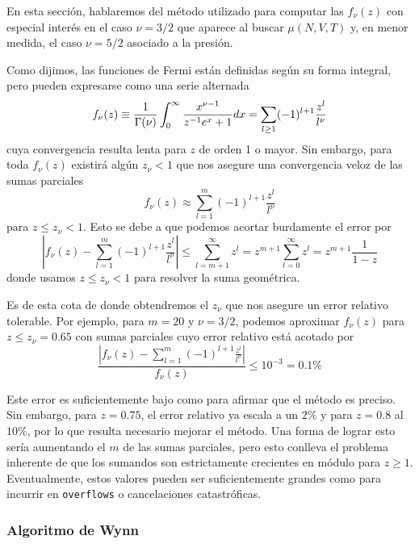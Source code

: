 En esta sección, hablaremos del método utilizado para computar las $f_\nu(z)$ con especial interés en el caso $\nu=3/2$ que aparece al buscar $\mu(N,V,T)$
y, en menor medida, el caso $\nu=5/2$ asociado a la presión.

Como dijimos, las funciones de Fermi están definidas según su forma integral, pero pueden expresarse como una serie alternada
\begin{equation}{\label{eq:fermi_func_serie}}
 f_\nu(z) \equiv \frac{1}{\Gamma(\nu)}\int_0^\infty \frac{x^{\nu-1}}{z^{-1}e^x+1} dx = \sum_{l\geq 1} (-1)^{l+1}\frac{z^l}{l^\nu}
\end{equation}
cuya convergencia resulta lenta para $z$ de orden 1 o mayor.
Sin embargo, para toda $f_\nu(z)$ existirá algún $z_\nu < 1$ que nos asegure una convergencia veloz de las sumas parciales
\[ f_\nu(z) \approx \sum_{l=1}^{m} (-1)^{l+1}\frac{z^l}{l^\nu}\]
para $z\leq z_\nu < 1$.
Esto se debe a que podemos acortar burdamente el error por
\[ \left|f_\nu(z) - \sum_{l=1}^{m}(-1)^{l+1}\frac{z^l}{l^\nu}\right| \leq \sum_{l=m+1}^\infty z^l = z^{m+1}\sum_{l=0}^\infty z^l = z^{m+1} \frac{1}{1-z} \]
donde usamos $z\leq z_\nu < 1$ para resolver la suma geométrica.

Es de esta cota de donde obtendremos el $z_\nu$ que nos asegure un error relativo tolerable.
Por ejemplo, para $m=20$ y $\nu = 3/2$, podemos aproximar $f_\nu(z)$ para $z\leq z_\nu = 0.65$ con sumas parciales cuyo error relativo está acotado por
\[\frac{|f_\nu(z) - \sum_{l=1}^{m}(-1)^{l+1}\frac{z^l}{l^\nu}|}{f_\nu(z)} \leq 10^{-3} = 0.1\%\]

Este error es suficientemente bajo como para afirmar que el método es preciso.
Sin embargo, para $z = 0.75$, el error relativo ya escala a un $2\%$ y para $z=0.8$ al $10\%$, por lo que resulta necesario mejorar el método.
Una forma de lograr esto sería aumentando el $m$ de las sumas parciales, pero esto conlleva el problema inherente de que los sumandos son estrictamente crecientes en módulo para $z\geq 1$.
Eventualmente, estos valores pueden ser suficientemente grandes como para incurrir en \texttt{overflows} o cancelaciones catastróficas.

\subsubsection{Algoritmo de Wynn}

